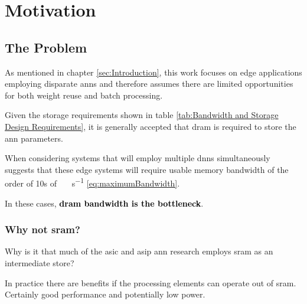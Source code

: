 



\chapter{Motivation}
\label{Motivation}


\section[The Problem]{The Problem}
\label{sec:The Problem}

As mentioned in chapter \ref{sec:Introduction}, this work focuses on edge applications employing disparate \ac{ann}s and therefore assumes there are limited opportunities for both weight reuse and batch processing.

Given the storage requirements shown in table \ref{tab:Bandwidth and Storage Design Requirements}, it is generally accepted that \ac{dram} is required to store the \ac{ann} parameters.

When considering systems that will employ multiple \ac{dnn}s simultaneously suggests that these edge systems will require usable memory bandwidth of the order of 10s of \SI[per-mode=symbol]{}{\tera \bit \per \second} \eqref{eq:maximumBandwidth}.

In these cases, \textbf{\textcolor{black}{\ac{dram} bandwidth is the bottleneck}}.

\iffalse
Given the bandwidth and storage requirements shown in table \ref{tab:Bandwidth and Storage Design Requirements}, the problem becomes \hyphenquote{american}{\textbf{\textcolor{black}{to provide deterministic at or near real-time performance within tolerable power and space constraints for edge systems employing inference on multiple disparate useful-sized neural networks.}}}
\fi


\subsection{Why not \ac{sram}?}
\label{sec:Why not SRAM}

Why is it that much of the \ac{asic} and \ac{asip} \ac{ann} research employs \ac{sram} as an intermediate store? 

In practice there are benefits if the processing elements can operate out of \ac{sram}.
Certainly good performance and potentially low power.

